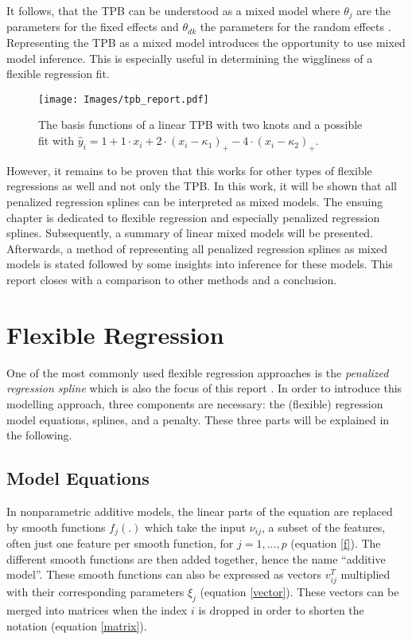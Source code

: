 \documentclass[12pt]{article}
\begin{document}
It follows, that the TPB can be understood as a mixed model where $\theta_j$ are the parameters for the fixed effects and $\theta_{dk}$ the parameters for the random effects \cite{ruppert2003semiparametric}. Representing the TPB as a mixed model introduces the opportunity to use mixed model inference. This is especially useful in determining the wiggliness of a flexible regression fit.

\begin{figure}
\begin{center}
\texttt{[image: Images/tpb\_report.pdf]}
\end{center}
\vspace{-2em}
\caption[caption]{The basis functions of a linear TPB with two knots and a possible fit with $\hat{y}_i = 1 + 1 \cdot x_i +  2 \cdot(x_i-\kappa_1)_+ - 4\cdot (x_i-\kappa_2)_+.$}\label{tpb}
\end{figure}

However, it remains to be proven that this works for other types of flexible regressions as well and not only the TPB. 
In this work, it will be shown that all penalized regression splines can be interpreted as mixed models. The ensuing chapter is dedicated to flexible regression and especially penalized regression splines. Subsequently, a summary of linear mixed models will be presented. Afterwards, a method of representing all penalized regression splines as mixed models is stated followed by some insights into inference for these models. This report closes with a comparison to other methods and a conclusion.


\section{Flexible Regression}

One of the most commonly used flexible regression approaches is the \textit{penalized regression spline} which is also the focus of this report \cite{fahrmeir2013regression, ruppert2003semiparametric, wood2017generalized}. In order to introduce this modelling approach, three components are necessary: the (flexible) regression model equations, splines, and a penalty. These three parts will be explained in the following.

\subsection{Model Equations}

In nonparametric additive models, the linear parts of the equation are replaced by smooth functions $f_j(.)$ which take the input $\nu_{ij}$, a subset of the features, often just one feature per smooth function, for $j = 1,...,p$ (equation \ref{f}). 
The different smooth functions are then added together, hence the name ``additive model''.
These smooth functions can also be expressed as vectors $v^T_{ij}$  multiplied with their corresponding parameters $\xi_j$ (equation \ref{vector}). These vectors can be merged into matrices when the index $i$ is dropped in order to shorten the notation (equation \ref{matrix}).
\end{document}
